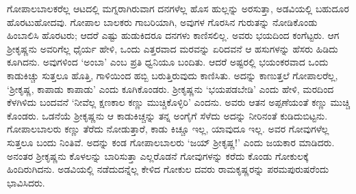 ಗೋಪಾಲಬಾಲಕರೆಲ್ಲ ಆಟದಲ್ಲಿ ಮಗ್ನರಾಗಿರುವಾಗ ದನಗಳೆಲ್ಲ ಹೊಸ ಹುಲ್ಲನ್ನು ಅರಸುತ್ತಾ, ಅಡವಿಯಲ್ಲಿ ಬಹುದೂರ ಹೊರಟುಹೋದವು. ಗೋಪಾಲ ಬಾಲಕರು ಗಾಬರಿಯಾಗಿ, ಅವುಗಳ ಗೊರಸಿನ ಗುರುತನ್ನು ನೋಡಿಕೊಂಡು ಹಿಂಬಾಲಿಸಿ ಹೊರಟರು; ಆದರೆ ಎಷ್ಟು ಹುಡುಕಿದರೂ ದನಗಳು ಕಾಣಿಸಲಿಲ್ಲ. ಅವರು ಭಯದಿಂದ ಕಂಗೆಟ್ಟರು. ಆಗ ಶ್ರೀಕೃಷ್ಣನು ಅವರಿಗೆಲ್ಲ ಧೈರ್ಯ ಹೇಳಿ, ಒಂದು ಎತ್ತರವಾದ ಮರವನ್ನು ಏರಿದವನೆ ಆ ಹಸುಗಳನ್ನು ಹೆಸರು ಹಿಡಿದು ಕೂಗಿದನು. ಅವುಗಳಿಂದ ‘ಅಂಬಾ’ ಎಂಬ ಪ್ರತಿ ಧ್ವನಿಯೂ ಬಂದಿತು. ಆದರೆ ಅಷ್ಟರಲ್ಲಿ ಭಯಂಕರವಾದ ಒಂದು ಕಾಡುಕಿಚ್ಚು ಸುತ್ತಲೂ ಹೊತ್ತಿ, ಗಾಳಿಯಿಂದ ಹಬ್ಬಿ ಬರುತ್ತಿರುವುದು ಕಾಣಿಸಿತು. ಅದನ್ನು ಕಾಣುತ್ತಲೆ ಗೋಪಾಲರೆಲ್ಲ, ‘ಶ್ರೀಕೃಷ್ಣ, ಕಾಪಾಡು ಕಾಪಾಡು’ ಎಂದು ಕೂಗಿಕೊಂಡರು. ಶ್ರೀಕೃಷ್ಣನು ‘ಭಯಪಡಬೇಡಿ’ ಎಂದು ಹೇಳಿ, ಮರದಿಂದ ಕೆಳಗಿಳಿದು ಬಂದವನೆ ‘ನೀವೆಲ್ಲ ಕ್ಷಣಕಾಲ ಕಣ್ಣು ಮುಚ್ಚಿಕೊಳ್ಳಿರಿ’ ಎಂದನು. ಅವರು ಆತನ ಅಪ್ಪಣೆಯಂತೆ ಕಣ್ಣು ಮುಚ್ಚಿ ಕೊಂಡರು. ಒಡನೆಯೆ ಶ್ರೀಕೃಷ್ಣನು ಆ ಕಾಡುಕಿಚ್ಚನ್ನು ತನ್ನ ಅಂಗೈಗೆ ಸೆಳೆದು ಅದನ್ನು ನೀರಿನಂತೆ ಕುಡಿದುಬಿಟ್ಟನು. ಗೋಪಾಲಬಾಲರು ಕಣ್ಣು ತೆರೆದು ನೋಡುತ್ತಾರೆ, ಕಾಡು ಕಿಚ್ಚೂ ಇಲ್ಲ, ಯಾವುದೂ ಇಲ್ಲ. ಅವರ ಗೋವುಗಳೆಲ್ಲ ಸುತ್ತಲೂ ಬಂದು ನಿಂತಿವೆ. ಅದನ್ನು ಕಂಡ ಗೋಪಾಲಬಾಲರು ‘ಜಯ್ ಶ್ರೀಕೃಷ್ಣ!’ ಎಂದು ಜಯಕಾರ ಮಾಡಿದರು. ಅನಂತರ ಶ್ರೀಕೃಷ್ಣನು ಕೊಳಲನ್ನು ಬಾರಿಸುತ್ತಾ ಎಲ್ಲರೊಡನೆ ಗೋವುಗಳನ್ನು ಕರೆದು ಕೊಂಡು ಗೋಕುಲಕ್ಕೆ ಹಿಂದಿರುಗಿದನು. ಅಡವಿಯಲ್ಲಿ ನಡೆದುದನ್ನೆಲ್ಲ ಕೇಳಿದ ಗೋಕುಲ ದವರು ರಾಮಕೃಷ್ಣರನ್ನು ಪರಮಪುರುಷರೆಂದು ಭಾವಿಸಿದರು.

